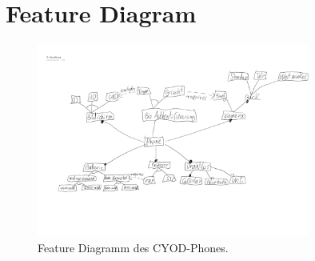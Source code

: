 \chapter{Feature Diagram}


\begin{figure}[h!]
	\centering
	\includegraphics[width=0.8\textwidth, clip]{images/9Hausuebung_SW.pdf}
	\caption{Feature Diagramm des CYOD-Phones.}
	\label{fig:graphLCOM}
\end{figure}
